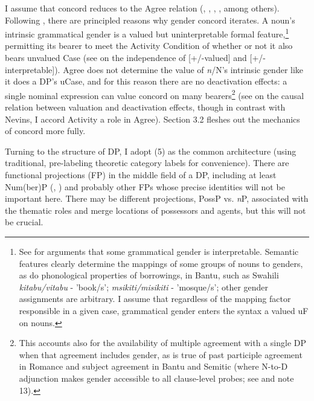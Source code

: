 \documentclass[output=paper
,modfonts
,nonflat]{langsci/langscibook}
\begin{document}
I assume that concord reduces to the Agree relation (\citealt{Baker2008}, \citealt{Carstens2000}, \citealt{Danon2011}, \citealt{Koopman2006}, \citealt{Toosarvandani_Van_Urk2014} among others). Following \citet{Carstens2010, Carstens2011}, there are principled reasons why gender concord iterates. A noun's intrinsic grammatical gender is a valued but uninterpretable formal feature,\footnote{See \citet{Kramer2015} for arguments that some grammatical gender is interpretable. Semantic features clearly determine the mappings of some groups of nouns to genders, as do phonological properties of borrowings, in Bantu, such as Swahili \textit{kitabu/vitabu} - 'book/s'; \textit{msikiti/misikiti} - 'mosque/s'; other gender assignments are arbitrary. I assume that regardless of the mapping factor responsible in a given case, grammatical gender enters the syntax a valued uF on nouns.} permitting its bearer to meet the Activity Condition of \citet{Chomsky2001} whether or not it also bears unvalued Case (see \citealt{Pesetsky_Torrego2007} on the independence of [+/-valued] and [+/-interpretable]). Agree does not determine the value of \textit{n}/N’s intrinsic gender like it does a DP's uCase, and for this reason there are no {\textquotedbl}deactivation{\textquotedbl} effects: a single nominal expression can value concord on many bearers\footnote{This accounts also for the availability of multiple agreement with a single DP when that agreement includes gender, as is true of past participle agreement in Romance and subject agreement in Bantu and Semitic (where N-to-D adjunction makes gender accessible to all clause-level probes; see \citealt{Carstens2011} and note 13).} (see \citealt{Nevins2005} on the causal relation between valuation and deactivation effects, though in contrast with Nevins, I accord Activity a role in Agree). Section 3.2 fleshes out the mechanics of concord more fully.

Turning to the structure of DP, I adopt (5) as the common architecture (using traditional, pre-labeling theoretic category labels for convenience). There are functional projections (FP) in the middle field of a DP, including at least Num(ber)P (\citealt{Carstens1991}, \citealt{Ritter1991, Ritter1992}) and probably other FPs whose precise identities will not be important here. There may be different projections, PossP vs. \textit{n}P, associated with the thematic roles and merge locations of possessors and agents, but this will not be crucial.
\end{document}
